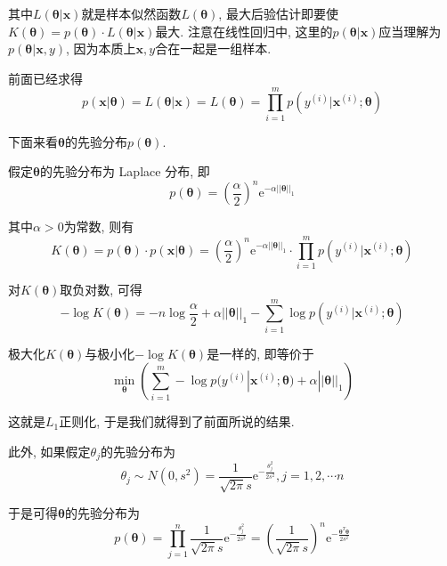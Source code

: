 \documentclass[a4paper,UTF8]{ctexart}
\theoremstyle{plain} \newtheorem{theorem}{定理}[section]
\theoremstyle{plain} \newtheorem{definition}{定义}[section]
\theoremstyle{plain} \newtheorem{lemma}{引理}[section]
\theoremstyle{plain} \newtheorem{proposition}{命题}[section]
\theoremstyle{plain} \newtheorem{example}{例}[section]
\theoremstyle{plain} \newtheorem{remark}{注}[section]
\theoremstyle{plain} \newtheorem{corollary}{推论}[section]
\begin{document}
其中$L(\bm{\theta} | \bm{x})$就是样本似然函数$L(\bm{\theta})$, 最大后验估计即要使$K(\bm{\theta}) = p(\bm{\theta}) \cdot L(\bm{\theta | x})$最大. 注意在线性回归中, 这里的$p(\bm{\theta} | \bm{x})$应当理解为$p(\bm{\theta} | \bm{x}, y)$, 因为本质上$\bm{x}, y$合在一起是一组样本.

前面已经求得
\begin{equation*}
p(\bm{x} | \bm{\theta}) = L(\bm{\theta} | \bm{x}) = L(\bm{\theta}) = \prod_{i=1}^{m} p(y^{(i)} | \bm{x}^{(i)}; \bm{\theta})
\end{equation*}

下面来看$\bm{\theta}$的先验分布$p(\bm{\theta})$.

假定$\bm{\theta}$的先验分布为 Laplace 分布, 即
\begin{equation*}
p(\bm{\theta}) = \left( \frac{\alpha}{2} \right)^{n} \mathrm{e}^{-\alpha ||\bm{\theta}||_{1}}
\end{equation*}

其中$\alpha > 0$为常数, 则有
\begin{equation*}
K(\bm{\theta}) = p(\bm{\theta}) \cdot p(\bm{x | \theta}) = \left(\frac{\alpha}{2} \right)^{n} \mathrm{e}^{-\alpha ||\bm{\theta}||_{1}} \cdot \prod_{i=1}^{m} p(y^{(i)}|\bm{x}^{(i)}; \bm{\theta})
\end{equation*}

对$K(\bm{\theta})$取负对数, 可得
\begin{equation*}
-\log K(\bm{\theta}) = - n \log \frac{\alpha}{2} + \alpha ||\bm{\theta}||_{1} - \sum_{i=1}^{m} \log p(y^{(i)}|\bm{x}^{(i)};\bm{\theta})
\end{equation*}

极大化$K(\bm{\theta})$与极小化$-\log K(\bm{\theta})$是一样的, 即等价于
\begin{equation*}
\min_{\bm{\theta}} \left( \sum_{i=1}^{m} - \log p(y^{(i)}|\bm{x}^{(i)};\bm{\theta}) + \alpha ||\bm{\theta}||_{1} \right)
\end{equation*}

这就是$L_{1}$正则化, 于是我们就得到了前面所说的结果.

此外, 如果假定$\theta_j$的先验分布为
\begin{equation*}
\theta_{j} \sim N(0,s^{2}) = \frac{1}{\sqrt{2 \pi} s} \mathrm{e}^{-\frac{\theta_{j}^{2}}{2s^2}} , j = 1,2,\cdots n
\end{equation*}

于是可得$\bm{\theta}$的先验分布为
\begin{equation*}
p(\bm{\theta}) = \prod_{j=1}^{n} \frac{1}{\sqrt{2 \pi} s} \mathrm{e}^{-\frac{\theta_{j}^{2}}{2s^2}} = \left( \frac{1}{\sqrt{2 \pi} s} \right)^{n} \mathrm{e}^{-\frac{\bm{\theta}^{T} \bm{\theta}}{2s^2}}
\end{equation*}
\end{document}
